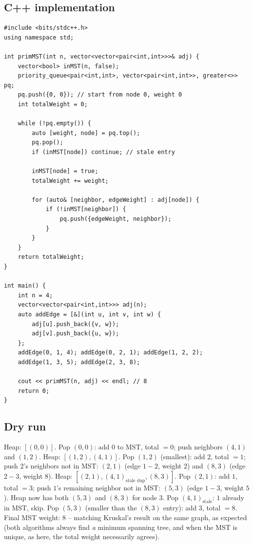 \subsection*{C++ implementation}

\begin{lstlisting}
#include <bits/stdc++.h>
using namespace std;

int primMST(int n, vector<vector<pair<int,int>>>& adj) {
    vector<bool> inMST(n, false);
    priority_queue<pair<int,int>, vector<pair<int,int>>, greater<>> pq;
    pq.push({0, 0}); // start from node 0, weight 0
    int totalWeight = 0;

    while (!pq.empty()) {
        auto [weight, node] = pq.top();
        pq.pop();
        if (inMST[node]) continue; // stale entry

        inMST[node] = true;
        totalWeight += weight;

        for (auto& [neighbor, edgeWeight] : adj[node]) {
            if (!inMST[neighbor]) {
                pq.push({edgeWeight, neighbor});
            }
        }
    }
    return totalWeight;
}

int main() {
    int n = 4;
    vector<vector<pair<int,int>>> adj(n);
    auto addEdge = [&](int u, int v, int w) {
        adj[u].push_back({v, w});
        adj[v].push_back({u, w});
    };
    addEdge(0, 1, 4); addEdge(0, 2, 1); addEdge(1, 2, 2);
    addEdge(1, 3, 5); addEdge(2, 3, 8);

    cout << primMST(n, adj) << endl; // 8
    return 0;
}
\end{lstlisting}

\subsection*{Dry run}


Heap: $[(0,0)]$. Pop $(0,0)$: add $0$ to MST, total $=0$; push
neighbors $(4,1)$ and $(1,2)$. Heap: $[(1,2),(4,1)]$. Pop $(1,2)$
(smallest): add $2$, total $=1$; push $2$'s neighbors not in MST:
$(2,1)$ (edge $1{-}2$, weight $2$) and $(8,3)$ (edge $2{-}3$, weight
$8$). Heap: $[(2,1),(4,1)_{\text{stale dup}},(8,3)]$. Pop $(2,1)$:
add $1$, total $=3$; push $1$'s remaining neighbor not in MST: $(5,3)$
(edge $1{-}3$, weight $5$). Heap now has both $(5,3)$ and $(8,3)$ for
node $3$. Pop $(4,1)_{\text{stale}}$: $1$ already in MST, skip. Pop
$(5,3)$ (smaller than the $(8,3)$ entry): add $3$, total $=8$. Final
MST weight: $8$ -- matching Kruskal's result on the same graph, as
expected (both algorithms always find \emph{a} minimum spanning tree,
and when the MST is unique, as here, the total weight necessarily
agrees).

